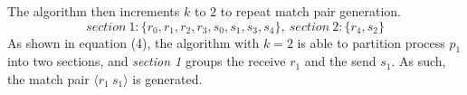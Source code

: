 The algorithm then increments $k$ to $2$ to repeat match pair generation. 
\begin{equation}
\mathit{section\ 1: }\{r_0,r_1, r_2,r_3,s_0,s_1,s_3,s_4\},\ \mathit{section\ 2: }\{r_4,s_2\}
\end{equation}
As shown in equation (4), the algorithm with $k=2$ is able to partition process $p_1$ into two sections, and \textit{section 1} groups the receive $r_1$ and the send $s_1$. As such, the match pair $\langle r_1\ s_1\rangle$ is generated.






